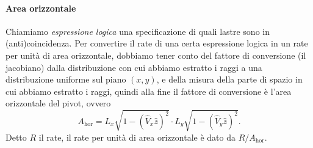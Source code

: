 \paragraph{Area orizzontale}

Chiamiamo \emph{espressione logica} una specificazione di quali lastre sono in (anti)coincidenza.
Per convertire il rate di una certa espressione logica in un rate per unità di area orizzontale,
dobbiamo tener conto del fattore di conversione (il jacobiano)
dalla distribuzione con cui abbiamo estratto i raggi a una distribuzione uniforme sul piano $(x,y)$,
e della misura della parte di spazio in cui abbiamo estratto i raggi,
quindi alla fine il fattore di conversione è l'area orizzontale del pivot,
ovvero
\begin{equation*}
	A_\text{hor} = L_x \sqrt{1-(\hat V_x\hat z)^2} \cdot L_y \sqrt{1-(\hat V_y\hat z)^2}.
\end{equation*}
Detto $R$ il rate, il rate per unità di area orizzontale è dato da $R/A_\text{hor}$.

